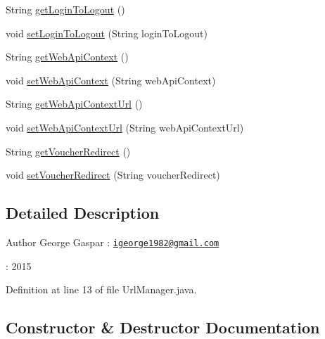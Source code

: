 \begin{DoxyCompactItemize}
\item 
String \hyperlink{classcom_1_1dalogin_1_1_url_manager_a9496ce3a9d0be6ff469b35eac3f4c0d9}{get\+Login\+To\+Logout} ()
\item 
void \hyperlink{classcom_1_1dalogin_1_1_url_manager_a1668934ed0cf34128e63c6b8e004182a}{set\+Login\+To\+Logout} (String login\+To\+Logout)
\item 
String \hyperlink{classcom_1_1dalogin_1_1_url_manager_ab6013bcf6b39e4372eab0111622d8fa1}{get\+Web\+Api\+Context} ()
\item 
void \hyperlink{classcom_1_1dalogin_1_1_url_manager_a09d2ebb1e23646cebad40ac5d5dcc2ab}{set\+Web\+Api\+Context} (String web\+Api\+Context)
\item 
String \hyperlink{classcom_1_1dalogin_1_1_url_manager_aad597875cd0f6bc45cd2ba822834351b}{get\+Web\+Api\+Context\+Url} ()
\item 
void \hyperlink{classcom_1_1dalogin_1_1_url_manager_a7eabfd586a88ee1679e4dc1b18f1d823}{set\+Web\+Api\+Context\+Url} (String web\+Api\+Context\+Url)
\item 
String \hyperlink{classcom_1_1dalogin_1_1_url_manager_ae70ac1b1bff4fe04fdfabb1f8957bdf7}{get\+Voucher\+Redirect} ()
\item 
void \hyperlink{classcom_1_1dalogin_1_1_url_manager_a1fb3ef89677add2b1ae7e4ea5e0f717d}{set\+Voucher\+Redirect} (String voucher\+Redirect)
\end{DoxyCompactItemize}


\subsection{Detailed Description}
\begin{DoxyAuthor}{Author}
George Gaspar \+: \href{mailto:igeorge1982@gmail.com}{\tt igeorge1982@gmail.\+com}
\end{DoxyAuthor}
\+: 2015 

Definition at line 13 of file Url\+Manager.\+java.



\subsection{Constructor \& Destructor Documentation}
\mbox{\label{classcom_1_1dalogin_1_1_url_manager_a38786ff9058bce6b0d4993d3844fcd38}} 
